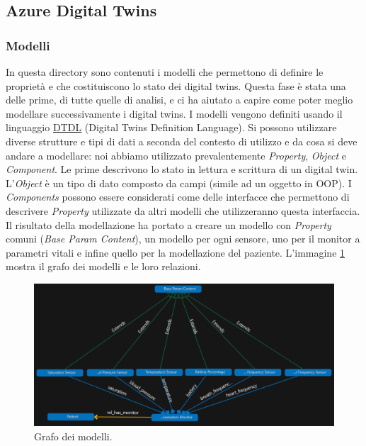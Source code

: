 \subsection{Azure Digital Twins}

\subsubsection{Modelli}
In questa directory sono contenuti i modelli che permettono di definire le proprietà e che costituiscono lo stato dei digital twins. Questa fase è stata una delle prime, di tutte quelle di analisi, e ci ha aiutato a capire come poter meglio modellare successivamente i digital twins. \newline \newline I modelli vengono definiti usando il linguaggio \href{https://github.com/Azure/opendigitaltwins-dtdl/blob/master/DTDL/v2/dtdlv2.md}{DTDL} (Digital Twins Definition Language). Si possono utilizzare diverse strutture e tipi di dati a seconda del contesto di utilizzo e da cosa si deve andare a modellare: noi abbiamo utilizzato prevalentemente \textit{Property}, \textit{Object} e \textit{Component}. Le prime descrivono lo stato in lettura e scrittura di un digital twin. L'\textit{Object} è un tipo di dato composto da campi (simile ad un oggetto in OOP). I \textit{Components} possono essere considerati come delle interfacce che permettono di descrivere \textit{Property} utilizzate da altri modelli che utilizzeranno questa interfaccia. Il risultato della modellazione ha portato a creare un modello con \textit{Property} comuni (\textit{Base Param Content}), un modello per ogni sensore, uno per il monitor a parametri vitali e infine quello per la modellazione del paziente.  L'immagine \ref{pic:model-graph} mostra il grafo dei modelli e le loro relazioni. \newline \newline \newline \begin{figure}[ht]
    \includegraphics[width=14cm]{Images/ModelGraph.PNG}
    \centering
    \caption{\label{pic:model-graph}Grafo dei modelli.}
\end{figure}
